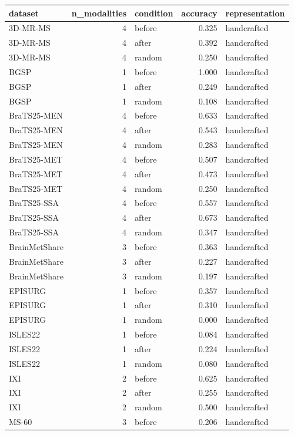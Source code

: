 \begin{tabular}{lrlrl}
\toprule
dataset & n\_modalities & condition & accuracy & representation \\
\midrule
3D-MR-MS & 4 & before & 0.325 & handcrafted \\
3D-MR-MS & 4 & after & 0.392 & handcrafted \\
3D-MR-MS & 4 & random & 0.250 & handcrafted \\
BGSP & 1 & before & 1.000 & handcrafted \\
BGSP & 1 & after & 0.249 & handcrafted \\
BGSP & 1 & random & 0.108 & handcrafted \\
BraTS25-MEN & 4 & before & 0.633 & handcrafted \\
BraTS25-MEN & 4 & after & 0.543 & handcrafted \\
BraTS25-MEN & 4 & random & 0.283 & handcrafted \\
BraTS25-MET & 4 & before & 0.507 & handcrafted \\
BraTS25-MET & 4 & after & 0.473 & handcrafted \\
BraTS25-MET & 4 & random & 0.250 & handcrafted \\
BraTS25-SSA & 4 & before & 0.557 & handcrafted \\
BraTS25-SSA & 4 & after & 0.673 & handcrafted \\
BraTS25-SSA & 4 & random & 0.347 & handcrafted \\
BrainMetShare & 3 & before & 0.363 & handcrafted \\
BrainMetShare & 3 & after & 0.227 & handcrafted \\
BrainMetShare & 3 & random & 0.197 & handcrafted \\
EPISURG & 1 & before & 0.357 & handcrafted \\
EPISURG & 1 & after & 0.310 & handcrafted \\
EPISURG & 1 & random & 0.000 & handcrafted \\
ISLES22 & 1 & before & 0.084 & handcrafted \\
ISLES22 & 1 & after & 0.224 & handcrafted \\
ISLES22 & 1 & random & 0.080 & handcrafted \\
IXI & 2 & before & 0.625 & handcrafted \\
IXI & 2 & after & 0.255 & handcrafted \\
IXI & 2 & random & 0.500 & handcrafted \\
MS-60 & 3 & before & 0.206 & handcrafted \\

\end{tabular}
